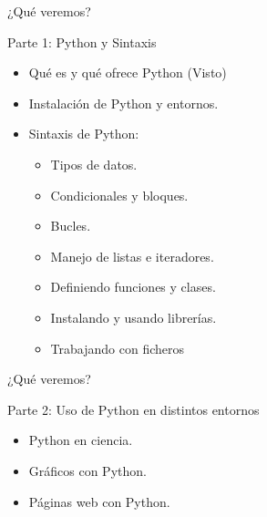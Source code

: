 \documentclass[bigger,unknownkeysallowed]{beamer}
\begin{document}
\begin{frame}[label={sec:orgf123b0e}]{¿Qué veremos?}
\begin{block}{Parte 1: Python y Sintaxis}
\begin{itemize}
\item Qué es y qué ofrece Python (Visto)

\item Instalación de Python y entornos.

\item Sintaxis de Python:

\begin{itemize}
\item Tipos de datos.

\item Condicionales y bloques.

\item Bucles.

\item Manejo de listas e iteradores.

\item Definiendo funciones y clases.

\item Instalando y usando librerías.

\item Trabajando con ficheros
\end{itemize}
\end{itemize}
\end{block}
\end{frame}

\begin{frame}[label={sec:org6bd9782}]{¿Qué veremos?}
\begin{block}{Parte 2: Uso de Python en distintos entornos}
\begin{itemize}
\item Python en ciencia.

\item Gráficos con Python.

\item Páginas web con Python.
\end{itemize}
\end{block}
\end{frame}
\end{document}
